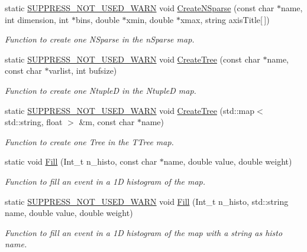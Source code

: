 \begin{DoxyCompactItemize}
static \hyperlink{HistClass_8hh_a85edd6ac47f5ea2970c76af20855738c}{S\-U\-P\-P\-R\-E\-S\-S\-\_\-\-N\-O\-T\-\_\-\-U\-S\-E\-D\-\_\-\-W\-A\-R\-N} void \hyperlink{namespaceHistClass_a254d1f7bca1d82049547093cc7755a5b}{Create\-N\-Sparse} (const char $\ast$name, int dimension, int $\ast$bins, double $\ast$xmin, double $\ast$xmax, string axis\-Title\mbox{[}$\,$\mbox{]})
\begin{DoxyCompactList}\small\item\em Function to create one N\-Sparse in the n\-Sparse map. \end{DoxyCompactList}\item 
static \hyperlink{HistClass_8hh_a85edd6ac47f5ea2970c76af20855738c}{S\-U\-P\-P\-R\-E\-S\-S\-\_\-\-N\-O\-T\-\_\-\-U\-S\-E\-D\-\_\-\-W\-A\-R\-N} void \hyperlink{namespaceHistClass_a6b2238e3440f49c8effd1c9c363ccdcc}{Create\-Tree} (const char $\ast$name, const char $\ast$varlist, int bufsize)
\begin{DoxyCompactList}\small\item\em Function to create one Ntuple\-D in the Ntuple\-D map. \end{DoxyCompactList}\item 
static \hyperlink{HistClass_8hh_a85edd6ac47f5ea2970c76af20855738c}{S\-U\-P\-P\-R\-E\-S\-S\-\_\-\-N\-O\-T\-\_\-\-U\-S\-E\-D\-\_\-\-W\-A\-R\-N} void \hyperlink{namespaceHistClass_ae9f060aaab764a00aaead1f45ac8c663}{Create\-Tree} (std\-::map$<$ std\-::string, float $>$ \&m, const char $\ast$name)
\begin{DoxyCompactList}\small\item\em Function to create one Tree in the T\-Tree map. \end{DoxyCompactList}\item 
static void \hyperlink{namespaceHistClass_afb5f8a57c50703889081b9b86a44ad4b}{Fill} (Int\-\_\-t n\-\_\-histo, const char $\ast$name, double value, double weight)
\begin{DoxyCompactList}\small\item\em Function to fill an event in a 1\-D histogram of the map. \end{DoxyCompactList}\item 
static \hyperlink{HistClass_8hh_a85edd6ac47f5ea2970c76af20855738c}{S\-U\-P\-P\-R\-E\-S\-S\-\_\-\-N\-O\-T\-\_\-\-U\-S\-E\-D\-\_\-\-W\-A\-R\-N} void \hyperlink{namespaceHistClass_ad3cd1cf763a65901cb1489de8edecc5c}{Fill} (Int\-\_\-t n\-\_\-histo, std\-::string name, double value, double weight)
\begin{DoxyCompactList}\small\item\em Function to fill an event in a 1\-D histogram of the map with a string as histo name. \end{DoxyCompactList}\item 

\end{DoxyCompactItemize}
